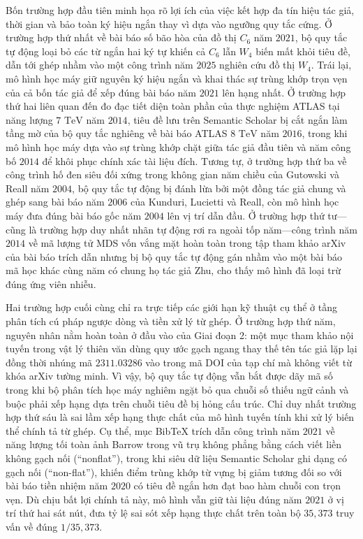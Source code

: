 Bốn trường hợp đầu tiên minh họa rõ lợi ích của việc kết hợp đa tín hiệu tác giả, thời gian và bảo toàn ký hiệu ngắn thay vì dựa vào ngưỡng quy tắc cứng. Ở trường hợp thứ nhất về bài báo số bão hòa của đồ thị $C_6$ năm $2021$, bộ quy tắc tự động loại bỏ các từ ngắn hai ký tự khiến cả $C_6$ lẫn $W_4$ biến mất khỏi tiêu đề, dẫn tới ghép nhầm vào một công trình năm $2025$ nghiên cứu đồ thị $W_4$. Trái lại, mô hình học máy giữ nguyên ký hiệu ngắn và khai thác sự trùng khớp trọn vẹn của cả bốn tác giả để xếp đúng bài báo năm $2021$ lên hạng nhất. Ở trường hợp thứ hai liên quan đến đo đạc tiết diện toàn phần của thực nghiệm ATLAS tại năng lượng $7\text{ TeV}$ năm $2014$, tiêu đề lưu trên Semantic Scholar bị cắt ngắn làm tầng mờ của bộ quy tắc nghiêng về bài báo ATLAS $8\text{ TeV}$ năm $2016$, trong khi mô hình học máy dựa vào sự trùng khớp chặt giữa tác giả đầu tiên và năm công bố $2014$ để khôi phục chính xác tài liệu đích. Tương tự, ở trường hợp thứ ba về công trình hố đen siêu đối xứng trong không gian năm chiều của Gutowski và Reall năm $2004$, bộ quy tắc tự động bị đánh lừa bởi một đồng tác giả chung và ghép sang bài báo năm $2006$ của Kunduri, Lucietti và Reall, còn mô hình học máy đưa đúng bài báo gốc năm $2004$ lên vị trí dẫn đầu. Ở trường hợp thứ tư---cũng là trường hợp duy nhất nhãn tự động rơi ra ngoài tốp năm---công trình năm $2014$ về mã lượng tử MDS vốn vắng mặt hoàn toàn trong tập tham khảo arXiv của bài báo trích dẫn nhưng bị bộ quy tắc tự động gán nhầm vào một bài báo mã học khác cùng năm có chung họ tác giả Zhu, cho thấy mô hình đã loại trừ đúng ứng viên nhiễu.

Hai trường hợp cuối cùng chỉ ra trực tiếp các giới hạn kỹ thuật cụ thể ở tầng phân tích cú pháp ngược dòng và tiền xử lý từ ghép. Ở trường hợp thứ năm, nguyên nhân nằm hoàn toàn ở đầu vào của Giai đoạn 2: một mục tham khảo nội tuyến trong vật lý thiên văn dùng quy ước gạch ngang thay thế tên tác giả lặp lại đồng thời nhúng mã $2311.03286$ vào trong mã DOI của tạp chí mà không viết từ khóa arXiv tường minh. Vì vậy, bộ quy tắc tự động vẫn bắt được dãy mã số trong khi bộ phân tích học máy nghiêm ngặt bỏ qua chuỗi số thiếu ngữ cảnh và buộc phải xếp hạng dựa trên chuỗi tiêu đề bị hỏng cấu trúc. Chỉ duy nhất trường hợp thứ sáu là sai lầm xếp hạng thực chất của mô hình tuyến tính khi xử lý biến thể chính tả từ ghép. Cụ thể, mục BibTeX trích dẫn công trình năm $2021$ về năng lượng tối toàn ảnh Barrow trong vũ trụ không phẳng bằng cách viết liền không gạch nối (``nonflat''), trong khi siêu dữ liệu Semantic Scholar ghi dạng có gạch nối (``non-flat''), khiến điểm trùng khớp từ vựng bị giảm tương đối so với bài báo tiền nhiệm năm $2020$ có tiêu đề ngắn hơn đạt bao hàm chuỗi con trọn vẹn. Dù chịu bất lợi chính tả này, mô hình vẫn giữ tài liệu đúng năm $2021$ ở vị trí thứ hai sát nút, đưa tỷ lệ sai sót xếp hạng thực chất trên toàn bộ $35{,}373$ truy vấn về đúng $1/35{,}373$.
